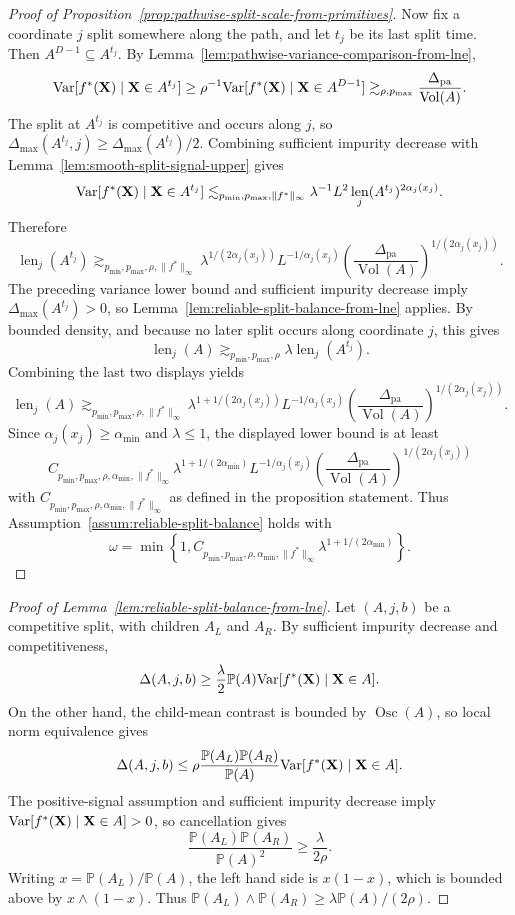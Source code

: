 \documentclass[11pt]{article}
\theoremstyle{plain}
\theoremstyle{definition}
\theoremstyle{remark}
\theoremstyle{plain}
\newcommand{\bX}{\mathbf{X}}
\renewcommand{\P}{\mathbb{P}}
\newcommand{\Var}{\textnormal{Var}}
\DeclareMathOperator{\Vol}{Vol}
\DeclareMathOperator{\len}{len}
\newcommand{\1}{\mathbbm{1}}
\newcommand{\Osc}{\operatorname{Osc}}
\begin{document}
\begin{proof}[Proof of Proposition~\ref{prop:pathwise-split-scale-from-primitives}]
Now fix a coordinate $j$ split somewhere along the path, and let $t_j$ be its last split time. Then $A^{D-1}\subseteq A^{t_j}$. By Lemma~\ref{lem:pathwise-variance-comparison-from-lne},
\[
\Var[f^*(\bX)\mid\bX\in A^{t_j}]
\ge
\rho^{-1}
\Var[f^*(\bX)\mid\bX\in A^{D-1}]
\gtrsim_{\rho,p_{\max}}
\frac{\Delta_{\mathrm{pa}}}{\Vol(A)}.
\]
The split at $A^{t_j}$ is competitive and occurs along $j$, so $\Delta_{\max}(A^{t_j},j)\ge \Delta_{\max}(A^{t_j})/2$. Combining sufficient impurity decrease with Lemma~\ref{lem:smooth-split-signal-upper} gives
\[
\Var[f^*(\bX)\mid\bX\in A^{t_j}]
\lesssim_{p_{\min},p_{\max},\|f^*\|_\infty}
\lambda^{-1}
L^2\len_j(A^{t_j})^{2\alpha_j(x_j)}.
\]
Therefore
\[
\len_j(A^{t_j})
\gtrsim_{p_{\min},p_{\max},\rho,\|f^*\|_\infty}
\lambda^{1/(2\alpha_j(x_j))}
L^{-1/\alpha_j(x_j)}
\left(
\frac{\Delta_{\mathrm{pa}}}{\Vol(A)}
\right)^{1/(2\alpha_j(x_j))}.
\]
The preceding variance lower bound and sufficient impurity decrease imply $\Delta_{\max}(A^{t_j})>0$, so Lemma~\ref{lem:reliable-split-balance-from-lne} applies.
By bounded density, and because no later split occurs along coordinate $j$, this gives
\[
\len_j(A)
\gtrsim_{p_{\min},p_{\max},\rho}
\lambda
\len_j(A^{t_j}).
\]
Combining the last two displays yields
\[
\len_j(A)
\gtrsim_{p_{\min},p_{\max},\rho,\|f^*\|_\infty}
\lambda^{1+1/(2\alpha_j(x_j))}
L^{-1/\alpha_j(x_j)}
\left(
\frac{\Delta_{\mathrm{pa}}}{\Vol(A)}
\right)^{1/(2\alpha_j(x_j))}.
\]
Since $\alpha_j(x_j)\ge\alpha_{\min}$ and $\lambda\le1$, the displayed lower bound is at least
\[
C_{p_{\min},p_{\max},\rho,\alpha_{\min},\|f^*\|_\infty}
\lambda^{1+1/(2\alpha_{\min})}
L^{-1/\alpha_j(x_j)}
\left(
\frac{\Delta_{\mathrm{pa}}}{\Vol(A)}
\right)^{1/(2\alpha_j(x_j))}
\]
with $C_{p_{\min},p_{\max},\rho,\alpha_{\min},\|f^*\|_\infty}$ as defined in the proposition statement.
Thus Assumption~\ref{assum:reliable-split-balance} holds with
\[
\omega
=
\min\left\{1,
C_{p_{\min},p_{\max},\rho,\alpha_{\min},\|f^*\|_\infty}
\lambda^{1+1/(2\alpha_{\min})}
\right\}.
\]
\end{proof}

\begin{proof}[Proof of Lemma~\ref{lem:reliable-split-balance-from-lne}]
Let $(A,j,b)$ be a competitive split, with children $A_L$ and $A_R$.
By sufficient impurity decrease and competitiveness,
\[
\Delta(A,j,b)
\ge
\frac{\lambda}{2}\P(A)\Var[f^*(\bX)\mid\bX\in A].
\]
On the other hand, the child-mean contrast is bounded by $\Osc(A)$, so local norm equivalence gives
\[
\Delta(A,j,b)
\le
\rho
\frac{\P(A_L)\P(A_R)}{\P(A)}
\Var[f^*(\bX)\mid\bX\in A].
\]
The positive-signal assumption and sufficient impurity decrease imply $\Var[f^*(\bX)\mid\bX\in A]>0$, so cancellation gives
\[
\frac{\P(A_L)\P(A_R)}{\P(A)^2}
\ge
\frac{\lambda}{2\rho}.
\]
Writing $x=\P(A_L)/\P(A)$, the left hand side is $x(1-x)$, which is bounded above by $x\wedge(1-x)$.
Thus $\P(A_L)\wedge\P(A_R)\ge \lambda\P(A)/(2\rho)$.
\end{proof}
\end{document}
